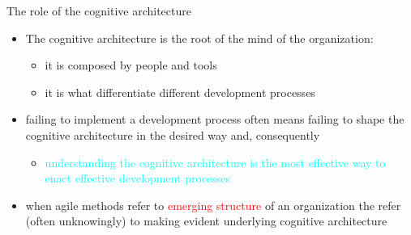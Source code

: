 \documentclass{beamer}
\begin{document}
\begin{frame}
{\centerline{The role of the cognitive architecture}}

\begin{itemize}
\item The cognitive architecture is the root of the mind of the organization:
\begin{itemize}
\item it is composed by people and tools
\item it is what differentiate different development processes
\end{itemize}
\item failing to implement a development process often means failing to shape the cognitive architecture in the desired way and, consequently
\begin{itemize}
\item \textcolor{cyan}{understanding the cognitive architecture is the most effective way to enact effective development processes}
\end{itemize}
\item when agile methods refer to \textcolor{red}{emerging structure} of an organization the refer (often unknowingly) to making evident underlying cognitive architecture
\end{itemize}

\end{frame}
\end{document}
